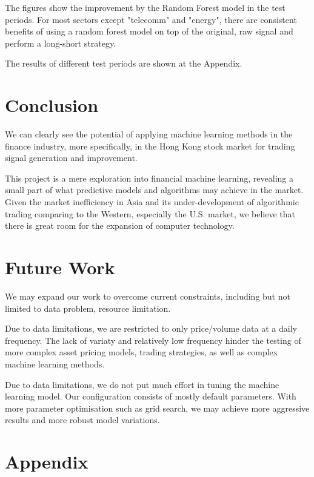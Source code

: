 \documentclass[12pt]{article}
\begin{document}
The figures show the improvement by the Random Forest model in the test periods. For most sectors except "telecomm" and "energy", there are consistent benefits of using a random forest model on top of the original, raw signal and perform a long-short strategy.

The results of different test periods are shown at the Appendix.

\section{Conclusion}

We can clearly see the potential of applying machine learning methods in the finance industry, more specifically, in the Hong Kong stock market for trading signal generation and improvement.

This project is a mere exploration into financial machine learning, revealing a small part of what predictive models and algorithms may achieve in the market. Given the market inefficiency in Asia and its under-development of algorithmic trading comparing to the Western, especially the U.S. market, we believe that there is great room for the expansion of computer technology.

\section{Future Work}

We may expand our work to overcome current constraints, including but not limited to data problem, resource limitation.

Due to data limitations, we are restricted to only price/volume data at a daily frequency. The lack of variaty and relatively low frequency hinder the testing of more complex asset pricing models, trading strategies, as well as complex machine learning methods.

Due to data limitations, we do not put much effort in tuning the machine learning model. Our configuration consists of mostly default parameters. With more parameter optimisation such as grid search, we may achieve more aggressive results and more robust model variations.

\section{Appendix}
\end{document}

